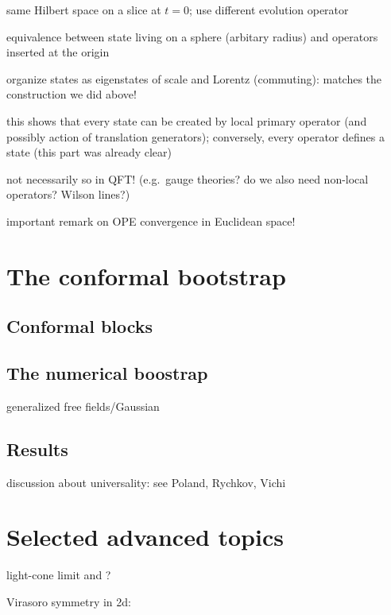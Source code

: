 \documentclass[a4paper,12pt]{article}
\numberwithin{equation}{section}
\begin{document}
same Hilbert space on a slice at $t = 0$; use different evolution operator


equivalence between state living on a sphere (arbitary radius) and operators inserted at the origin

organize states as eigenstates of scale and Lorentz (commuting): matches the construction we did above!

this shows that every state can be created by local primary operator (and possibly action of translation generators); conversely, every operator defines a state (this part was already clear)

not necessarily so in QFT! (e.g.~gauge theories? do we also need non-local operators? Wilson lines?)





important remark on OPE convergence in Euclidean space!


\section{The conformal bootstrap}

\subsection{Conformal blocks}

\subsection{The numerical boostrap}

generalized free fields/Gaussian

\subsection{Results}


discussion about universality: see Poland, Rychkov, Vichi


\section{Selected advanced topics}

light-cone limit and ?

Virasoro symmetry in 2d:
\end{document}
